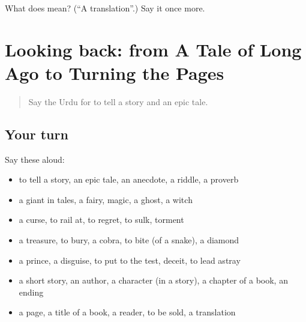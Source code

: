 \begin{tcolorbox}[breakable,colback=teal!4,colframe=teal!35!black,title={Before you move on}]
What does  mean? (\textquotedblleft{}A translation\textquotedblright{}.) Say it once more.
\end{tcolorbox}
\section[(dialogue)]{Looking back: from A Tale of Long Ago to Turning the Pages}

\label{lesson:UR-R330-review-324-330}



\begin{quote}
Say the Urdu for to tell a story and an epic tale.
\end{quote}

\subsection*{Your turn}
Say these aloud:

\begin{itemize}
\raggedright
  \item to tell a story, an epic tale, an anecdote, a riddle, a proverb
  \item a giant in tales, a fairy, magic, a ghost, a witch
  \item a curse, to rail at, to regret, to sulk, torment
  \item a treasure, to bury, a cobra, to bite (of a snake), a diamond
  \item a prince, a disguise, to put to the test, deceit, to lead astray
  \item a short story, an author, a character (in a story), a chapter of a book, an ending
  \item a page, a title of a book, a reader, to be sold, a translation
\end{itemize}

